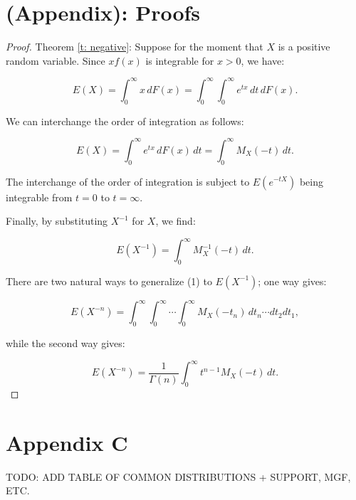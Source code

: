 \section{(Appendix): Proofs}\label{s:app_B}
\begin{proof}
    Theorem \ref{t: negative}:
Suppose for the moment that \( X \) is a positive random variable. Since \( x f(x) \) is integrable for \( x > 0 \), we have:

\[
E(X) = \int_0^\infty x \, dF(x) = \int_0^\infty \int_0^\infty e^{tx} \, dt \, dF(x).
\]

We can interchange the order of integration as follows:

\[
E(X) = \int_0^\infty e^{tx} \, dF(x) \, dt = \int_0^\infty M_X(-t) \, dt.
\]

The interchange of the order of integration is subject to \( E(e^{-tX}) \) being integrable from \( t = 0 \) to \( t = \infty \).

Finally, by substituting \( X^{-1} \) for \( X \), we find:

\[
E(X^{-1}) = \int_0^\infty M_X^{-1}(-t) \, dt.
\]

There are two natural ways to generalize (1) to \( E(X^{-1}) \); one way gives:

\[
E(X^{-n}) = \int_0^\infty \int_0^\infty \cdots \int_0^\infty M_X(-t_n) \, dt_n \cdots dt_2 dt_1, \tag{2}
\]

while the second way gives:

\[
E(X^{-n}) = \frac{1}{\Gamma(n)} \int_0^\infty t^{n-1} M_X(-t) \, dt.
\]
\cite{cressie1981}
\end{proof}
\newpage
\section{Appendix C }\label{s: app_C}
TODO: ADD TABLE OF COMMON DISTRIBUTIONS + SUPPORT, MGF, ETC.
